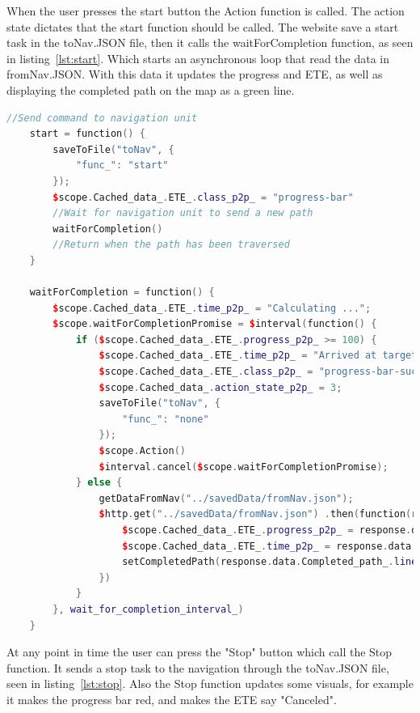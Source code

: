 When the user presses the start button the Action function is called. The action state dictates that the start function should be called.  The website save a start task in the toNav.JSON file, then it calls the waitForCompletion function, as seen in listing~\ref{lst:start}. Which starts an asynchronous loop that read the data in fromNav.JSON. With this data it updates the progress and ETE, as well as displaying the completed path on the map as a green line. 

\begin{lstlisting}[caption = {the start and waitForCompletion functions in p2p.js}, captionpos=b, label={lst:start}, language=C++,firstnumber=1]
    //Send command to navigation unit
    start = function() {
        saveToFile("toNav", {
            "func_": "start"
        });
        $scope.Cached_data_.ETE_.class_p2p_ = "progress-bar"
        //Wait for navigation unit to send a new path
        waitForCompletion()
        //Return when the path has been traversed
    }

    waitForCompletion = function() {
        $scope.Cached_data_.ETE_.time_p2p_ = "Calculating ...";
        $scope.waitForCompletionPromise = $interval(function() {
            if ($scope.Cached_data_.ETE_.progress_p2p_ >= 100) {
                $scope.Cached_data_.ETE_.time_p2p_ = "Arrived at target";
                $scope.Cached_data_.ETE_.class_p2p_ = "progress-bar-success"
                $scope.Cached_data_.action_state_p2p_ = 3;
                saveToFile("toNav", {
                    "func_": "none"
                });
                $scope.Action()
                $interval.cancel($scope.waitForCompletionPromise);
            } else {
                getDataFromNav("../savedData/fromNav.json");
                $http.get("../savedData/fromNav.json") .then(function(response) {
					$scope.Cached_data_.ETE_.progress_p2p_ = response.data.Progress_.percentage_;
                    $scope.Cached_data_.ETE_.time_p2p_ = response.data.Progress_.ete_;
                    setCompletedPath(response.data.Completed_path_.line_);
                })
            }
        }, wait_for_completion_interval_)
    }
\end{lstlisting}

At any point in time the user can press the "Stop" button which call the Stop function. It sends a stop task to the navigation through the toNav.JSON file, seen in listing~\ref{lst:stop}. Also the Stop function updates some visuals, for example it makes the progress bar red, and makes the ETE say "Canceled".

